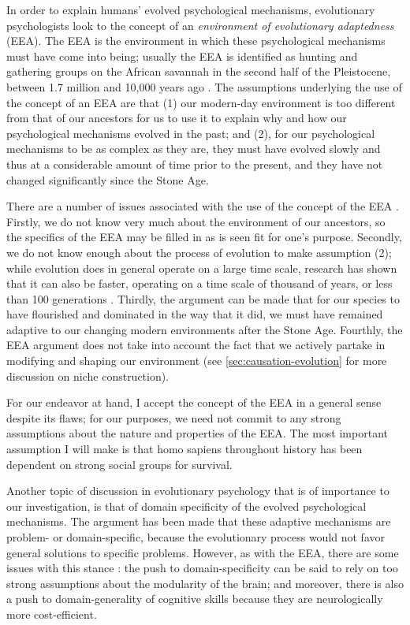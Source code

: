 In order to explain humans' evolved psychological mechanisms, evolutionary psychologists look to the concept of an \emph{environment of evolutionary adaptedness} (EEA). The EEA is the environment in which these psychological mechanisms must have come into being; usually the EEA is identified as hunting and gathering groups on the African savannah in the second half of the Pleistocene, between 1.7 million and 10,000 years ago \citep{LB02}.
The assumptions underlying the use of the concept of an EEA are that (1) our modern-day environment is too different from that of our ancestors for us to use it to explain why and how our psychological mechanisms evolved in the past; and (2), for our psychological mechanisms to be as complex as they are, they must have evolved slowly and thus at a considerable amount of time prior to the present, and they have not changed significantly since the Stone Age.

There are a number of issues associated with the use of the concept of the EEA \citep{LB02}. Firstly, we do not know very much about the environment of our ancestors, so the specifics of the EEA may be filled in as is seen fit for one's purpose. Secondly, we do not know enough about the process of evolution to make assumption (2); while evolution does in general operate on a large time scale, research has shown that it can also be faster, operating on a time scale of thousand of years, or less than 100 generations \citep[pp.~190--191 and references therein]{LB02}. Thirdly, the argument can be made that for our species to have flourished and dominated in the way that it did, we must have remained adaptive to our changing modern environments after the Stone Age. Fourthly, the EEA argument does not take into account the fact that we actively partake in modifying and shaping our environment (see \cref{sec:causation-evolution} for more discussion on niche construction).

For our endeavor at hand, I accept the concept of the EEA in a general sense despite its flaws; for our purposes, we need not commit to any strong assumptions about the nature and properties of the EEA. The most important assumption I will make is that homo sapiens throughout history has been dependent on strong social groups for survival.

Another topic of discussion in evolutionary psychology that is of importance to our investigation, is that of domain specificity of the evolved psychological mechanisms. The argument has been made \citep[p.~50]{Buss15} that these adaptive mechanisms are problem- or domain-specific, because the evolutionary process would not favor general solutions to specific problems.
However, as with the EEA, there are some issues with this stance \citep{LB02}: the push to domain-specificity can be said to rely on too strong assumptions about the modularity of the brain; and moreover, there is also a push to domain-generality of cognitive skills because they are neurologically more cost-efficient.

